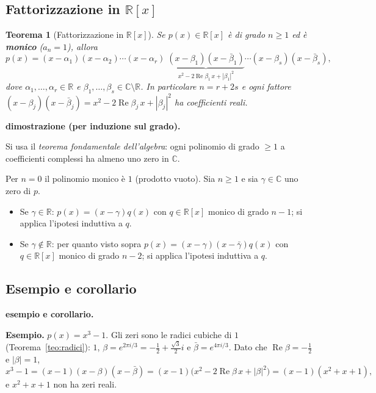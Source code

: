 \documentclass[11pt,a4paper]{article}
\newcommand{\RR}{\mathbb{R}}
\newcommand{\CC}{\mathbb{C}}
\renewcommand{\Re}{\operatorname{Re}}
\theoremstyle{plain}
\newtheorem{teo}[prop]{Teorema}
\theoremstyle{definition}
\theoremstyle{remark}
\begin{document}
\subsection{Fattorizzazione in $\RR[x]$}

\begin{teo}[{Fattorizzazione in $\RR[x]$}]\label{teo:fattorizzazione}
Se $p(x)\in\RR[x]$ è di grado $n\ge1$ ed è \textbf{monico} ($a_n=1$), allora
\[
  p(x)=(x-\alpha_1)(x-\alpha_2)\cdots(x-\alpha_r)\;
  \underbrace{(x-\beta_1)(x-\bar\beta_1)}_{x^2-2\Re\beta_1\,x+|\beta_1|^2}\cdots(x-\beta_s)(x-\bar\beta_s),
\]
dove $\alpha_1,\dots,\alpha_r\in\RR$ e $\beta_1,\dots,\beta_s\in\CC\setminus\RR$.
In particolare $n=r+2s$ e ogni fattore $(x-\beta_j)(x-\bar\beta_j)=x^2-2\Re\beta_j\,x+|\beta_j|^2$ ha coefficienti reali.
\end{teo}

\par\medskip
\noindent\textbf{dimostrazione (per induzione sul grado).}\par

Si usa il \emph{teorema fondamentale dell'algebra}: ogni polinomio di grado $\ge1$ a coefficienti complessi ha almeno uno zero in $\CC$.

Per $n=0$ il polinomio monico è $1$ (prodotto vuoto). Sia $n\ge1$ e sia $\gamma\in\CC$ uno zero di $p$.
\begin{itemize}[leftmargin=*]
  \item Se $\gamma\in\RR$: $p(x)=(x-\gamma)q(x)$ con $q\in\RR[x]$ monico di grado $n-1$; si applica l'ipotesi induttiva a $q$.
  \item Se $\gamma\notin\RR$: per quanto visto sopra $p(x)=(x-\gamma)(x-\bar\gamma)q(x)$ con $q\in\RR[x]$ monico di grado $n-2$;
  si applica l'ipotesi induttiva a $q$.
\end{itemize}
\par\medskip

\subsection{Esempio e corollario}

\par\medskip
\noindent\textbf{esempio e corollario.}\par

\textbf{Esempio.} $p(x)=x^3-1$. Gli zeri sono le radici cubiche di $1$ (Teorema~\ref{teo:radici}):
$1$, $\beta=e^{2\pi i/3}=-\tfrac12+\tfrac{\sqrt3}2i$ e $\bar\beta=e^{4\pi i/3}$. Dato che $\Re\beta=-\tfrac12$ e $|\beta|=1$,
\[
  x^3-1=(x-1)(x-\beta)(x-\bar\beta)=(x-1)\bigl(x^2-2\Re\beta\,x+|\beta|^2\bigr)=(x-1)(x^2+x+1),
\]
e $x^2+x+1$ non ha zeri reali.
\end{document}
